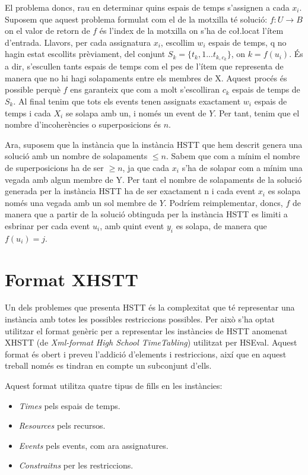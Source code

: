 \documentclass[11pt,a4paper,twoside]{report}
\begin{document}
    El problema doncs, rau en determinar quins espais de temps s'assignen a cada $x_i$. 
    Suposem que aquest problema formulat com el de la motxilla té solució: $f: U \rightarrow B$ on el valor de retorn de $f$ és l'index de la motxilla on s'ha de co\l.locat l'ítem d'entrada. 
    Llavors, per cada assignatura $x_i$, escollim $w_i$ espais de temps, q no hagin estat escollits prèviament, del conjunt $S_k = \{t_k,1 ... t_{k, c_k}\}$, on $k = f(u_i)$. 
    És a dir, s'escullen tants espais de temps com el pes de l'ítem que representa de manera que no hi hagi solapaments entre els membres de X. Aquest procés és possible perquè $f$ ens garanteix que com a molt s'escolliran $c_k$ espais de temps de $S_k$. 
    Al final tenim que tots els events tenen assignats exactament $w_i$ espais de temps i cada $X_i$ se solapa amb un, i només un event de $Y$. Per tant, tenim que el nombre d'incoherències o superposicions és $n$.
    
    Ara, suposem que la instància que la instància HSTT que hem descrit genera una solució amb un nombre de solapaments $\leq n$. Sabem que com a mínim el nombre de superposicions ha de ser $\geq n$, ja que cada $x_i$ 
    s'ha de solapar com a mínim una vegada amb algun membre de Y. Per tant el nombre de solapaments de la solució generada per la instància HSTT ha de ser exactament n i cada event $x_i$ es solapa només una vegada amb un sol membre de $Y$.
    Podríem reimplementar, doncs, $f$ de manera que a partir de la solució obtinguda per la instància HSTT es limiti a esbrinar per cada event $u_i$, amb quint event $y_i$ es solapa, de manera que $f(u_i) =j$.

  \section{Format XHSTT}
  Un dels problemes que presenta HSTT és la complexitat que té representar una instància amb totes les possibles restriccions possibles. Per això s'ha optat utilitzar el format genèric per a representar les instàncies de HSTT anomenat XHSTT (de \textit{Xml-format High School TimeTabling}) utilitzat per HSEval\cite{xhstt}.
  Aquest format és obert i preveu l'addició d'elements i restriccions, així que en aquest treball només es tindran en compte un subconjunt d'ells.
  
  Aquest format utilitza quatre tipus de fills en les instàncies:
  \begin{itemize}
    \item \textit{Times} pels espais de temps.
    \item \textit{Resources} pels recursos.
    \item \textit{Events} pels events, com ara assignatures.
    \item \textit{Constraitns} per les restriccions.
  \end{itemize}
\end{document}
